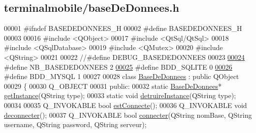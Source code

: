 \hypertarget{terminalmobile_2base_de_donnees_8h_source}{}\subsection{terminalmobile/base\+De\+Donnees.h}
\label{terminalmobile_2base_de_donnees_8h_source}

\begin{DoxyCode}
00001 \textcolor{preprocessor}{#ifndef BASEDEDONNEES\_H}
00002 \textcolor{preprocessor}{#define BASEDEDONNEES\_H}
00003 
00016 \textcolor{preprocessor}{#include <QObject>}
00017 \textcolor{preprocessor}{#include <QtSql/QtSql>}
00018 \textcolor{preprocessor}{#include <QSqlDatabase>}
00019 \textcolor{preprocessor}{#include <QMutex>}
00020 \textcolor{preprocessor}{#include <QString>}
00021 
00022 \textcolor{comment}{//#define DEBUG\_BASEDEDONNEES}
00023 
\hyperlink{terminalmobile_2base_de_donnees_8h_a3760799f66ae5bcba760a4a6550d4206}{00024} \textcolor{preprocessor}{#define NB\_BASEDEDONNEES    2}
\hyperlink{terminalmobile_2base_de_donnees_8h_a26d6b2af979a9747e911a07e64b2a954}{00025} \textcolor{preprocessor}{#define BDD\_SQLITE          0}
\hyperlink{terminalmobile_2base_de_donnees_8h_aaf0ca062171227e6cb5722ad110fb783}{00026} \textcolor{preprocessor}{#define BDD\_MYSQL           1}
00027 
00028 \textcolor{keyword}{class }\hyperlink{class_base_de_donnees}{BaseDeDonnees} : \textcolor{keyword}{public} QObject
00029 \{
00030     Q\_OBJECT
00031     \textcolor{keyword}{public}:
00032         \textcolor{keyword}{static} \hyperlink{class_base_de_donnees}{BaseDeDonnees}* \hyperlink{class_base_de_donnees_a80028aa2b6b4fbf30fb2e36357b7d3d3}{getInstance}(QString type);
00033         \textcolor{keyword}{static} \textcolor{keywordtype}{void} \hyperlink{class_base_de_donnees_a457401c0816b888c77ce915997545f4e}{detruireInstance}(QString type);
00034 
00035         Q\_INVOKABLE \textcolor{keywordtype}{bool} \hyperlink{class_base_de_donnees_a00388973f3ec42e5c8e76e7af7e124b2}{estConnecte}();
00036         Q\_INVOKABLE \textcolor{keywordtype}{void} \hyperlink{class_base_de_donnees_ae780999d25a26a0e4dbe0706a4785978}{deconnecter}();
00037         Q\_INVOKABLE \textcolor{keywordtype}{bool} \hyperlink{class_base_de_donnees_ac20da193923a9bfea5e38ee5a54820cd}{connecter}(QString nomBase, QString username, QString password, QString 
      serveur);

\end{DoxyCode}
